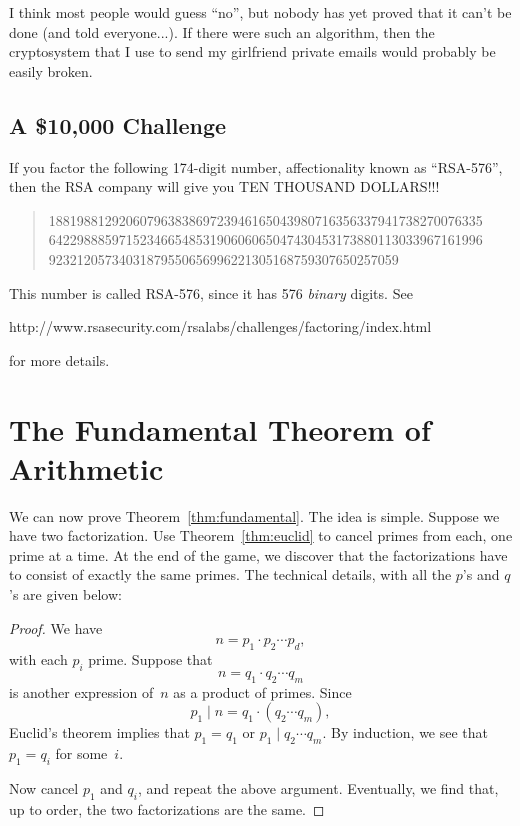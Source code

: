 \documentclass[11pt]{report}
\begin{document}
I think most people would guess ``no'', but nobody has yet proved that it
can't be done (and told everyone...).   If there were such an
algorithm, then the cryptosystem that I use to send my girlfriend
private emails would probably be easily broken.

\subsection{A \$10,000 Challenge}
If you factor the following 174-digit number, affectionality known as
``RSA-576'', then the RSA company will give you TEN THOUSAND DOLLARS!!!
\begin{quote}
  18819881292060796383869723946165043980716356337941738270076335\\
  64229888597152346654853190606065047430453173880113033967161996\\
  92321205734031879550656996221305168759307650257059
\end{quote}
This number is called RSA-576, since it has 576 {\em binary} digits.
See
\begin{center}
  \sf http://www.rsasecurity.com/rsalabs/challenges/factoring/index.html
\end{center}
for more details.

\section{The Fundamental Theorem of Arithmetic}
We can now prove Theorem~\ref{thm:fundamental}.  The idea is simple.
Suppose we have two factorization. Use Theorem~\ref{thm:euclid} to
cancel primes from each, one prime at a time.  At the end of the game,
we discover that the factorizations have to consist of exactly the
same primes.  The technical details, with all the $p$'s and $q$'s are
given below:

\begin{proof}
  We have
  $$n = p_1\cdot p_2 \cdots p_d,$$
  with each $p_i$ prime.
  Suppose that
  $$n = q_1\cdot q_2 \cdots q_m$$
  is another expression of~$n$ as a product of primes.
  Since
  $$p_1 \mid n = q_1\cdot (q_2 \cdots q_m),$$
  Euclid's theorem implies that $p_1 = q_1$ or
  $p_1 \mid q_2\cdots q_m$.  By induction, we see that $p_1 = q_i$ for some~$i$.

  Now cancel $p_1$ and $q_i$, and repeat the above argument.  Eventually,
  we find that, up to order, the two factorizations are the same.
\end{proof}
\end{document}
